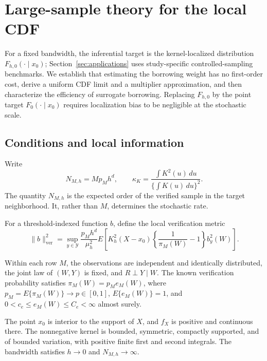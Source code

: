 \section{Large-sample theory for the local CDF}
\label{sec:theory}

For a fixed bandwidth, the inferential target is the kernel-localized
distribution \(F_{h,0}(\cdot\mid x_0)\); Section~\ref{sec:applications} uses
study-specific controlled-sampling benchmarks. We
establish that estimating the
borrowing weight has no first-order cost, derive a uniform CDF limit and a
multiplier approximation, and then characterize the efficiency of surrogate
borrowing. Replacing \(F_{h,0}\) by the point target
\(F_0(\cdot\mid x_0)\) requires localization bias to be negligible at the
stochastic scale.

\subsection{Conditions and local information}

Write
\[
N_{M,h}=Mp_Mh^d,
\qquad
\kappa_K=
\frac{\int K^2(u)\,du}{\{\int K(u)\,du\}^2}.
\]
The quantity \(N_{M,h}\) is the expected order of the verified sample in the
target neighborhood. It, rather than \(M\), determines the stochastic rate.

For a threshold-indexed function \(b\), define the local verification metric
\[
\|b\|_{\mathrm{ver}}^2
=
\sup_{y\in\mathcal Y}
\frac{p_Mh^d}{\mu_h^2}
E\left[
K_h^2(X-x_0)
\left\{\frac1{\pi_M(W)}-1\right\}b_y^2(W)
\right].
\]

\begin{highlevelassumption}
\label{ass:verification}
Within each row \(M\), the observations are independent and identically
distributed, the joint law of \((W,Y)\) is fixed, and \(R\perp Y\mid W\). The
known verification probability satisfies \(\pi_M(W)=p_Me_M(W)\), where
\(p_M=E\{\pi_M(W)\}\to p\in[0,1]\), \(E\{e_M(W)\}=1\), and
\(0<c_e\le e_M(W)\le C_e<\infty\) almost surely.
\end{highlevelassumption}

\begin{highlevelassumption}
\label{ass:localization}
The point \(x_0\) is interior to the support of \(X\), and \(f_X\) is positive
and continuous there. The nonnegative kernel is bounded, symmetric, compactly
supported, and of bounded variation, with positive finite first and second
integrals. The bandwidth satisfies \(h\to0\) and \(N_{M,h}\to\infty\).
\end{highlevelassumption}

